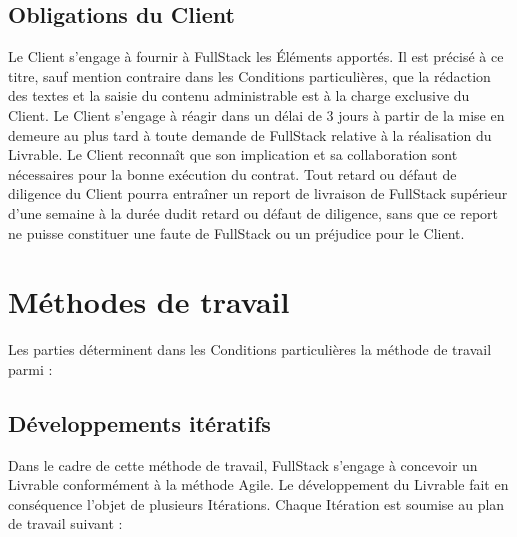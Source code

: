 \documentclass[11pt]{article}
\begin{document}
\subsection{Obligations du Client}

Le Client s’engage à fournir à FullStack les Éléments apportés. Il est précisé à ce titre, sauf mention contraire dans les Conditions particulières, que la rédaction des textes et la saisie du contenu administrable est à la charge exclusive du Client. Le Client s’engage à réagir dans un délai de 3 jours à partir de la mise en demeure au plus tard à toute demande de FullStack relative à la réalisation du Livrable. Le Client reconnaît que son implication et sa collaboration sont nécessaires pour la bonne exécution du contrat. Tout retard ou défaut de diligence du Client pourra entraîner un report de livraison de FullStack supérieur d’une semaine à la durée dudit retard ou défaut de diligence, sans que ce report ne puisse constituer une faute de FullStack ou un préjudice pour le Client.

\section{Méthodes de travail}

Les parties déterminent dans les Conditions particulières la méthode de travail parmi :

\subsection{Développements itératifs}

Dans le cadre de cette méthode de travail, FullStack s’engage à concevoir un Livrable conformément à la méthode Agile. Le développement du Livrable fait en conséquence l’objet de plusieurs Itérations. Chaque Itération est soumise au plan de travail suivant :
\end{document}
